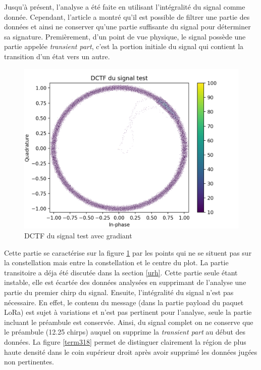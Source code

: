 \vspace{0.1cm}

Jusqu'à présent, l'analyse a été faite en utilisant l'intégralité du signal comme donnée. Cependant, l'article \cite{loraDCTF} a montré qu'il est possible de filtrer une partie des données et ainsi ne conserver qu'une partie suffisante du signal pour déterminer sa signature. Premièrement, d'un point de vue physique, le signal possède une partie appelée \textit{transient part}, c'est la portion initiale du signal qui contient la transition d'un état vers un autre.

\newpage

\begin{figure}[h]
\centering

\includegraphics[scale=0.3]{images/dctf4.png}
\caption{DCTF du signal test avec gradiant}\label{term317}
\end{figure}

Cette partie se caractérise sur la figure \ref{term317} par les points qui ne se situent pas sur la constellation mais entre la constellation et le centre du plot. La partie transitoire a déja été discutée dans la section \ref{urh}. Cette partie seule étant instable, elle est écartée des données analysées en supprimant de l'analyse une partie du premier chirp du signal. Ensuite, l'intégralité du signal n'est pas nécessaire. En effet, le contenu du message (dans la partie payload du paquet \ac{LoRa}) est sujet à variations et n'est pas pertinent pour l'analyse, seule la partie incluant le préambule est conservée. Ainsi, du signal complet on ne conserve que le préambule (12.25 chirps) auquel on supprime la \textit{transient part} au début des données. La figure \ref{term318} permet de distinguer clairement la région de plus haute densité dans le coin supérieur droit après avoir supprimé les données jugées non pertinentes.

